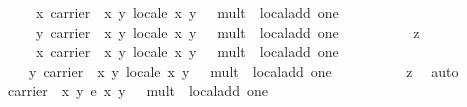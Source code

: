 \begin{isabellebody}
\ \ \ \ \ \ \ x\ {\isasymotimes}\isactrlbsub {\isasymlparr}carrier\ {\isacharequal}\ {\isacharbraceleft}{\isacharparenleft}x{\isacharcomma}\ y{\isacharparenright}{\isachardot}\ local{\isachardot}e\ x\ y\ {\isacharequal}\ {}{\isacharbraceright}{\isacharcomma}\ mult\ {\isacharequal}\ local{\isachardot}add{\isacharcomma}\ one\ {\isacharequal}\ {\isacharparenleft}{}{\isacharcomma}\ {}{\isacharparenright}{\isasymrparr}\isactrlesub \isanewline
\ \ \ \ \ \ \ y\ {\isasymotimes}\isactrlbsub {\isasymlparr}carrier\ {\isacharequal}\ {\isacharbraceleft}{\isacharparenleft}x{\isacharcomma}\ y{\isacharparenright}{\isachardot}\ local{\isachardot}e\ x\ y\ {\isacharequal}\ {}{\isacharbraceright}{\isacharcomma}\ mult\ {\isacharequal}\ local{\isachardot}add{\isacharcomma}\ one\ {\isacharequal}\ {\isacharparenleft}{}{\isacharcomma}\ {}{\isacharparenright}{\isasymrparr}\isactrlesub \isanewline
\ \ \ \ \ \ \ z\ {\isacharequal}\isanewline
\ \ \ \ \ \ \ x\ {\isasymotimes}\isactrlbsub {\isasymlparr}carrier\ {\isacharequal}\ {\isacharbraceleft}{\isacharparenleft}x{\isacharcomma}\ y{\isacharparenright}{\isachardot}\ local{\isachardot}e\ x\ y\ {\isacharequal}\ {}{\isacharbraceright}{\isacharcomma}\ mult\ {\isacharequal}\ local{\isachardot}add{\isacharcomma}\ one\ {\isacharequal}\ {\isacharparenleft}{}{\isacharcomma}\ {}{\isacharparenright}{\isasymrparr}\isactrlesub \isanewline
\ \ \ \ \ \ {\isacharparenleft}y\ {\isasymotimes}\isactrlbsub {\isasymlparr}carrier\ {\isacharequal}\ {\isacharbraceleft}{\isacharparenleft}x{\isacharcomma}\ y{\isacharparenright}{\isachardot}\ local{\isachardot}e\ x\ y\ {\isacharequal}\ {}{\isacharbraceright}{\isacharcomma}\ mult\ {\isacharequal}\ local{\isachardot}add{\isacharcomma}\ one\ {\isacharequal}\ {\isacharparenleft}{}{\isacharcomma}\ {}{\isacharparenright}{\isasymrparr}\isactrlesub \isanewline
\ \ \ \ \ \ \ z{\isacharparenright}{\isachardoublequoteclose}\ \isamarkupfalse%
\ auto\isanewline
{}\isamarkupfalse%
\isanewline
\ \ \isamarkupfalse%
\ {\isachardoublequoteopen}\isanewline
\ \ \ {\isasymone}\isactrlbsub {\isasymlparr}carrier\ {\isacharequal}\ {\isacharbraceleft}{\isacharparenleft}x{\isacharcomma}\ y{\isacharparenright}{\isachardot}\ e\ x\ y\ {\isacharequal}\ {}{\isacharbraceright}{\isacharcomma}\ mult\ {\isacharequal}\ local{\isachardot}add{\isacharcomma}\ one\ {\isacharequal}\ {\isacharparenleft}{}{\isacharcomma}\ {}{\isacharparenright}{\isasymrparr}\isactrlesub \isanewline

\end{isabellebody}

